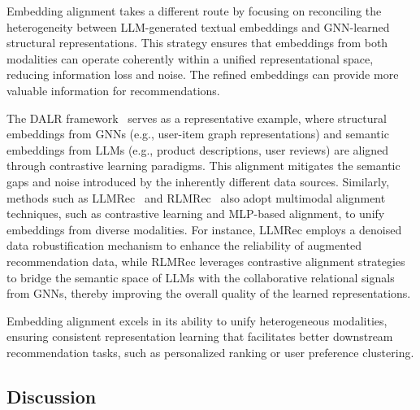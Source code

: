 Embedding alignment takes a different route by focusing on reconciling the heterogeneity between LLM-generated textual embeddings and GNN-learned structural representations. This strategy ensures that embeddings from both modalities can operate coherently within a unified representational space, reducing information loss and noise. The refined embeddings can provide more valuable information for recommendations.


The DALR framework~\cite{peng2024denoising} serves as a representative example, where structural embeddings from GNNs (e.g., user-item graph representations) and semantic embeddings from LLMs (e.g., product descriptions, user reviews) are aligned through contrastive learning paradigms. This alignment mitigates the semantic gaps and noise introduced by the inherently different data sources. Similarly, methods such as LLMRec~\cite{wei2024llmrec} and RLMRec~\cite{ren2024representation} also adopt multimodal alignment techniques, such as contrastive learning and MLP-based alignment, to unify embeddings from diverse modalities. For instance, LLMRec employs a denoised data robustification mechanism to enhance the reliability of augmented recommendation data, while RLMRec leverages contrastive alignment strategies to bridge the semantic space of LLMs with the collaborative relational signals from GNNs, thereby improving the overall quality of the learned representations.

Embedding alignment excels in its ability to unify heterogeneous modalities, ensuring consistent representation learning that facilitates better downstream recommendation tasks, such as personalized ranking or user preference clustering.

\subsection{Discussion}

